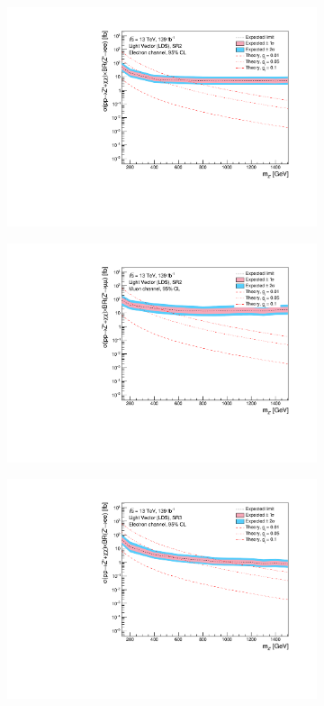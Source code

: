 \documentclass[12pt, a4paper]{book}
\begin{document}
\begin{figure}[!ht]
\begin{subfigure}[b]{0.49\textwidth}
      \includegraphics[width=1\textwidth]{Limits/Model_independent/100-150/LV_LDS/mass_exclusion_ee.pdf}
   \end{subfigure}
   \hfill
   \begin{subfigure}[b]{0.49\textwidth}
      \centering
      \includegraphics[width=1\textwidth]{Limits/Model_independent/100-150/LV_LDS/mass_exclusion_uu.pdf}
   \end{subfigure}
   \hfill
	\begin{subfigure}[b]{0.49\textwidth}
      \centering
      \includegraphics[width=1\textwidth]{Limits/Model_independent/150/LV_LDS/mass_exclusion_ee.pdf}

\end{subfigure}
\end{figure}
\end{document}
